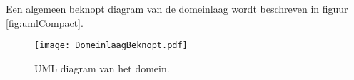 \label{bijlagen}
Een algemeen beknopt diagram van de domeinlaag wordt beschreven in figuur \ref{fig:umlCompact}.
\begin{figure}[h!]
\texttt{[image: DomeinlaagBeknopt.pdf]}
\caption{UML diagram van het domein.}
\label{fig:umlCompact}
\label{fig:DomeinlaagBeknopt}
\end{figure}
